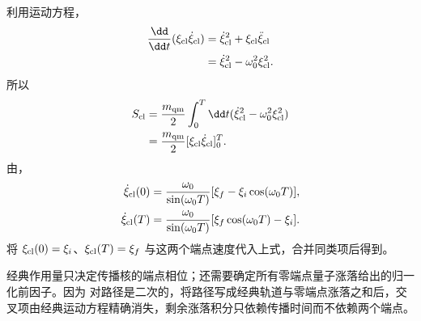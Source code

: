 \begin{exbox}[谐振子传播核]
利用运动方程，
\begin{align*}
 \frac{\dd}{\dd t}(\xi_{\rm cl}\dot\xi_{\rm cl})
 &=\dot\xi_{\rm cl}^2+\xi_{\rm cl}\ddot\xi_{\rm cl}\\
 &=\dot\xi_{\rm cl}^2-\omega_0^2\xi_{\rm cl}^2.
\end{align*}
所以
\begin{align*}
 S_{\rm cl}
 &=\frac{m_{\rm qm}}2\int_0^T\dd t
 (\dot\xi_{\rm cl}^2-\omega_0^2\xi_{\rm cl}^2)\\
 &=\frac{m_{\rm qm}}2[\xi_{\rm cl}\dot\xi_{\rm cl}]_0^T.
\end{align*}
由，
\begin{align*}
 \dot\xi_{\rm cl}(0)
 &=\frac{\omega_0}{\sin(\omega_0T)}
 [\xi_f-\xi_i\cos(\omega_0T)],\\
 \dot\xi_{\rm cl}(T)
 &=\frac{\omega_0}{\sin(\omega_0T)}
 [\xi_f\cos(\omega_0T)-\xi_i].
\end{align*}
将 $\xi_{\rm cl}(0)=\xi_i$、$\xi_{\rm cl}(T)=\xi_f$ 与这两个端点速度代入上式，合并同类项后得到。


\medskip

经典作用量只决定传播核的端点相位；还需要确定所有零端点量子涨落给出的归一化前因子。因为 对路径是二次的，将路径写成经典轨道与零端点涨落之和后，交叉项由经典运动方程精确消失，剩余涨落积分只依赖传播时间而不依赖两个端点。


\end{exbox}
